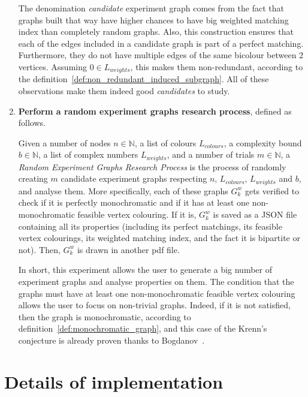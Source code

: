 \begin{enumerate}
    The denomination \textit{candidate} experiment graph comes from the fact that graphs built that way have higher chances to have big weighted matching index than completely random graphs.
    Also, this construction ensures that each of the edges included in a candidate graph is part of a perfect matching.
    Furthermore, they do not have multiple edges of the same bicolour between $2$ vertices.
    Assuming $0 \in L_{weights}$, this makes them non-redundant, according to the definition~\ref{def:non_redundant_induced_subgraph}.
    All of these observations make them indeed good \textit{candidates} to study.

    \item \textbf{Perform a random experiment graphs research process}, defined as follows.
        \begin{definition}
            \label{def:random_experiment_graphs_research_process}
            Given a number of nodes $n \in \mathbb{N}$, a list of colours $L_{colours}$, a complexity bound $b \in \mathbb{N}$, a list of complex numbers $L_{weights}$, and a number of trials $m \in \mathbb{N}$, a \textit{Random Experiment Graphs Research Process} is the process of randomly creating $m$ candidate experiment graphs respecting $n$, $L_{colours}$, $L_{weights}$ and $b$, and analyse them.
            More specifically, each of these graphs $G_k^w$ gets verified to check if it is perfectly monochromatic and if it has at least one non-monochromatic feasible vertex colouring.
            If it is, $G_k^w$ is saved as a JSON file containing all its properties (including its perfect matchings, its feasible vertex colourings, its weighted matching index, and the fact it is bipartite or not).
            Then, $G_k^w$ is drawn in another pdf file.
        \end{definition}

        In short, this experiment allows the user to generate a big number of experiment graphs and analyse properties on them.
        The condition that the graphs must have at least one non-monochromatic feasible vertex colouring allows the user to focus on non-trivial graphs.
        Indeed, if it is not satisfied, then the graph is monochromatic, according to definition~\ref{def:monochromatic_graph}, and this case of the Krenn's conjecture is already proven thanks to Bogdanov~\cite{bogdanov}.

\end{enumerate}


\section{Details of implementation}
\label{sec:details-of-implementation}

